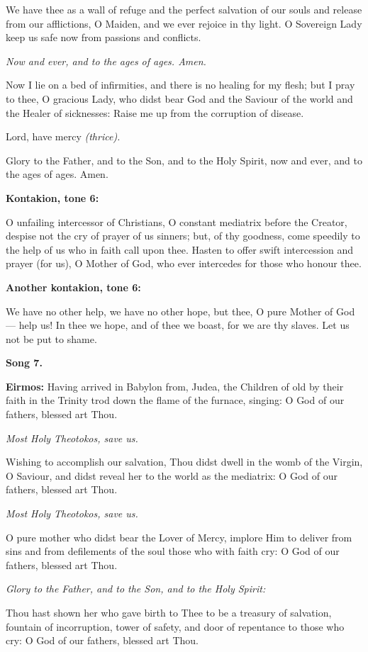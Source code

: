 We have thee as a wall of refuge and the perfect salvation of our souls and release from our afflictions, O Maiden, and we ever rejoice in thy light. 
O Sovereign Lady keep us safe now from passions and conflicts.

\emph{Now and ever, and to the ages of ages. Amen.}

Now I lie on a bed of infirmities, and there is no healing for my flesh; 
but I pray to thee, O gracious Lady, who didst bear God and the Saviour of the world and the Healer of sicknesses: Raise me up from the corruption of disease.

Lord, have mercy 
\emph{(thrice).}

Glory to the Father, and to the Son, and to the Holy Spirit, now and ever, and to the ages of ages. Amen.

\textbf{Kontakion, tone 6:}

O unfailing intercessor of Christians, O constant mediatrix before the Creator, despise not the cry of prayer of us sinners; 
but, of thy goodness, come speedily to the help of us who in faith call upon thee.
Hasten to offer swift intercession and prayer (for us), O Mother of God, who ever intercedes for those who honour thee.

\textbf{Another kontakion, tone 6:}

We have no other help, we have no other hope, but thee, O pure Mother of God--- help us! 
In thee we hope, and of thee we boast, for we are thy slaves. 
Let us not be put to shame.

\textbf{Song 7.}

\textbf{Eirmos:} 
Having arrived in Babylon from, Judea, the Children of old by their faith in the Trinity trod down the flame of the furnace, singing: 
O God of our fathers, blessed art Thou.

\emph{Most Holy Theotokos, save us.}

Wishing to accomplish our salvation, Thou didst dwell in the womb of the Virgin, O Saviour, and didst reveal her to the world as the mediatrix: 
O God of our fathers, blessed art Thou.

\emph{Most Holy Theotokos, save us.}

O pure mother who didst bear the Lover of Mercy, implore Him to deliver from sins and from defilements of the soul those who with faith cry: 
O God of our fathers, blessed art Thou.

\emph{Glory to the Father, and to the Son, and to the Holy Spirit:}

Thou hast shown her who gave birth to Thee to be a treasury of salvation, fountain of incorruption, tower of safety, and door of repentance to those who cry: 
O God of our fathers, blessed art Thou.

